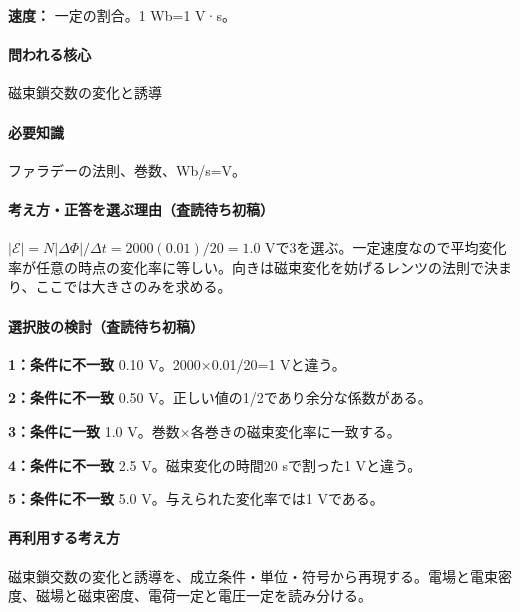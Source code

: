 \noindent\textbf{速度：} 一定の割合。1 Wb=\allowbreak{}1 V·s。\par

\paragraph{問われる核心} 磁束鎖交数の変化と誘導

\paragraph{必要知識} ファラデーの法則、巻数、Wb/s=\allowbreak{}V。

\paragraph{考え方・正答を選ぶ理由（査読待ち初稿）} \(|\mathcal E|=N|\Delta\Phi|/\Delta t=2000(0.01)/20=1.0\) Vで3を選ぶ。一定速度なので平均変化率が任意の時点の変化率に等しい。向きは磁束変化を妨げるレンツの法則で決まり、ここでは大きさのみを求める。

\paragraph{選択肢の検討（査読待ち初稿）}\mbox{}\par

\noindent\textbf{1：条件に不一致} 0.10 V。2000×0.01/20=\allowbreak{}1 Vと違う。\par

\noindent\textbf{2：条件に不一致} 0.50 V。正しい値の1/2であり余分な係数がある。\par

\noindent\textbf{3：条件に一致} 1.0 V。巻数×各巻きの磁束変化率に一致する。\par

\noindent\textbf{4：条件に不一致} 2.5 V。磁束変化の時間20 sで割った1 Vと違う。\par

\noindent\textbf{5：条件に不一致} 5.0 V。与えられた変化率では1 Vである。\par

\paragraph{再利用する考え方} 磁束鎖交数の変化と誘導を、成立条件・単位・符号から再現する。電場と電束密度、磁場と磁束密度、電荷一定と電圧一定を読み分ける。

